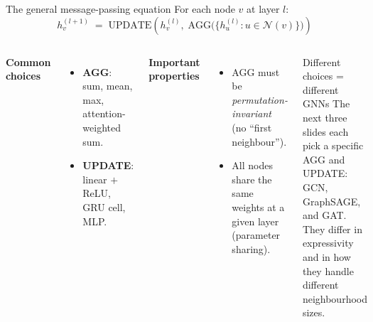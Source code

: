 \documentclass[aspectratio=169,10pt]{beamer}
\begin{document}
\begin{frame}{The general message-passing equation}
For each node $v$ at layer $l$:
\begin{equation*}
\boxed{\;h_v^{(l+1)} \;=\; \text{UPDATE}\!\left( h_v^{(l)},\; \text{AGG}\bigl(\{ h_u^{(l)} : u \in \mathcal{N}(v)\}\bigr) \right)\;}
\end{equation*}
\vspace{0.2em}
\begin{columns}[T]
\textbf{Common choices}
\begin{itemize}
  \item \textbf{AGG}: sum, mean, max, attention-weighted sum.
  \item \textbf{UPDATE}: linear $+$ ReLU, GRU cell, MLP.
\end{itemize}
\textbf{Important properties}
\begin{itemize}
  \item AGG must be \emph{permutation-invariant} (no ``first neighbour'').
  \item All nodes share the same weights at a given layer (parameter sharing).
\end{itemize}
\begin{block}{Different choices = different GNNs}
The next three slides each pick a specific AGG and UPDATE: GCN, GraphSAGE, and GAT. They differ in expressivity and in how they handle different neighbourhood sizes.
\end{block}
\end{columns}
\end{frame}
\end{document}

